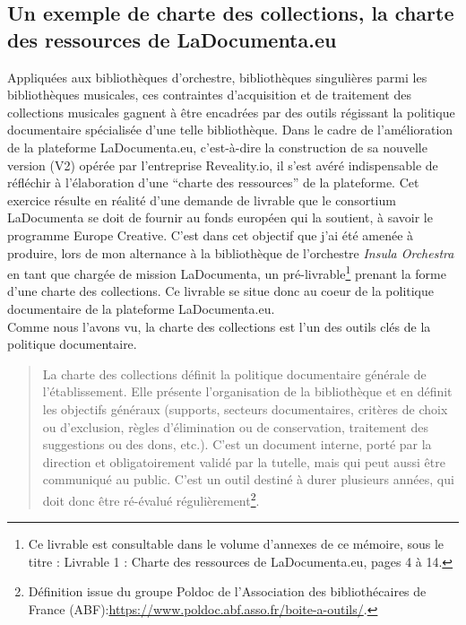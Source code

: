 \subsection*{Un exemple de charte des collections, la charte des ressources de LaDocumenta.eu}
\label{subsection:Un exemple de charte des collections, la charte des ressources de LaDocumenta.eu}

Appliquées aux bibliothèques d’orchestre, bibliothèques singulières parmi les bibliothèques musicales, ces contraintes d’acquisition et de traitement des collections musicales gagnent à être encadrées par des outils régissant la politique documentaire spécialisée d’une telle bibliothèque.  
Dans le cadre de l'amélioration de la plateforme LaDocumenta.eu, c'est-à-dire la construction de sa nouvelle version (V2) opérée par l'entreprise Reveality.io, il s'est avéré indispensable de réfléchir à l'élaboration d'une \enquote{charte des ressources} de la plateforme. Cet exercice résulte en réalité d'une demande de livrable que le consortium LaDocumenta se doit de fournir au fonds européen qui la soutient, à savoir le programme Europe Creative. C'est dans cet objectif que j'ai été amenée à produire, lors de mon alternance à la bibliothèque de l'orchestre \textit{Insula Orchestra} en tant que chargée de mission LaDocumenta, un pré-livrable\footnote{Ce livrable est consultable dans le volume d'annexes de ce mémoire, sous le titre : Livrable 1 : Charte des ressources de LaDocumenta.eu, pages 4 à 14.} prenant la forme d'une charte des collections. 
Ce livrable se situe donc au coeur de la politique documentaire de la plateforme LaDocumenta.eu. \\
Comme nous l'avons vu, la charte des collections est l'un des outils clés de la politique documentaire.
\begin{quotation}
La charte des collections définit la politique documentaire générale de l’établissement. Elle présente l’organisation de la bibliothèque et en définit les objectifs généraux (supports, secteurs documentaires, critères de choix ou d’exclusion, règles d’élimination ou de conservation, traitement des suggestions ou des dons, etc.). C’est un document interne, porté par la direction et obligatoirement validé par la tutelle, mais qui peut aussi être communiqué au public. C’est un outil destiné à durer plusieurs années, qui doit donc être ré-évalué régulièrement\footnote{Définition issue du groupe Poldoc de l'Association des bibliothécaires de France (ABF):\url{https://www.poldoc.abf.asso.fr/boite-a-outils/}.}.
\end{quotation}

